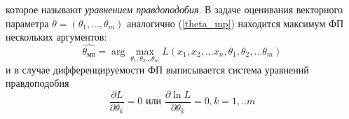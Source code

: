 \documentclass[12pt,a4paper]{scrartcl}
\begin{document}
    которое называют \textit{уравнением правдоподобия}.
    В задаче оценивания векторного параметра $\theta = (\theta_{1}, ... ,\theta_{m})$ аналогично (\ref{theta_mp}) находится максимум ФП нескольких аргументов: 
    \begin{equation}
        \hat{\theta_{мп}} = \arg \max_{\theta_{1}, \theta_{2}...\theta_{m}} L(x_{1}, x_{2},...x_{n}, \theta_{1}, \theta_{2},...\theta_{m})
        \label{multi_theta}
    \end{equation}
    и в случае дифференцируемости ФП выписывается система уравнений правдоподобия
    \begin{equation}
        \frac{\partial L}{\partial \theta_{k}} = 0 \text{  или  } \frac{\partial \ln L}{\partial \theta_{k}} = 0, k = 1,..m
    \end{equation}
\end{document}
